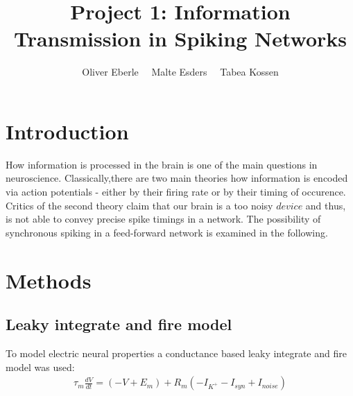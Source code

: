 \documentclass[12pt,a4paper, bibliography=totoc, listof=numbered, footexclude, BCOR=8.25mm, twoside]{scrartcl}
\begin{document}
 \title{Project 1: Information Transmission in Spiking Networks}
 \author{Oliver Eberle \ \  Malte Esders \ \ Tabea Kossen}
 \maketitle 
   \thispagestyle{empty}
 \newpage
 \section{Introduction}
 How information is processed in the brain is one of the main questions in neuroscience. Classically,there are two main theories how information is encoded via action potentials - either by their firing rate or by their timing of occurence.\\
 Critics of the second theory claim that our brain is a too noisy $device$ and thus, is not able to convey precise spike timings in a network. The possibility of synchronous spiking in a feed-forward network is examined in the following.
 
  
 \section{Methods}
 \subsection{Leaky integrate and fire model}
 To model electric neural properties a conductance based leaky integrate and fire model was used:
 \begin{align}
 \tau_m\frac{dV}{dt}= (-V + E_m) + R_m (- I_{K^+} - I_{syn} + I_{noise})
 \end{align}
 
\end{document}

